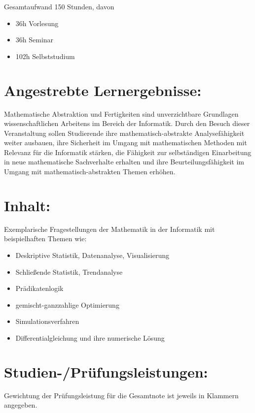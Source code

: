 Gesamtaufwand 150 Stunden, davon

\begin{itemize}
\tightlist
\item
  36h Vorlesung
\item
  36h Seminar
\item
  102h Selbststudium
\end{itemize}

\section*{Angestrebte
Lernergebnisse:}\label{angestrebte-lernergebnisse-2}

Mathematische Abstraktion und Fertigkeiten sind unverzichtbare
Grundlagen wissenschaftlichen Arbeitens im Bereich der Informatik. Durch
den Besuch dieser Veranstaltung sollen Studierende ihre
mathematisch-abstrakte Analysefähigkeit weiter ausbauen, ihre Sicherheit
im Umgang mit mathematischen Methoden mit Relevanz für die Informatik
stärken, die Fähigkeit zur selbständigen Einarbeitung in neue
mathematische Sachverhalte erhalten und ihre Beurteilungsfähigkeit im
Umgang mit mathematisch-abstrakten Themen erhöhen.

\section*{Inhalt:}\label{inhalt-2}

Exemplarische Fragestellungen der Mathematik in der Informatik mit
beispielhaften Themen wie:

\begin{itemize}
\tightlist
\item
  Deskriptive Statistik, Datenanalyse, Visualisierung
\item
  Schließende Statistik, Trendanalyse
\item
  Prädikatenlogik
\item
  gemischt-ganzzahlige Optimierung
\item
  Simulationsverfahren
\item
  Differentialgleichung und ihre numerische Lösung
\end{itemize}

\section*{Studien-/Prüfungsleistungen:}\label{studien-pruxfcfungsleistungen-2}

Gewichtung der Prüfungsleistung für die Gesamtnote ist jeweils in
Klammern angegeben.


